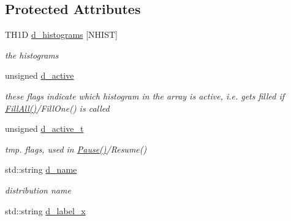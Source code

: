 \subsection*{Protected Attributes}
\begin{DoxyCompactItemize}
\item 
\hypertarget{classHistArray_a53fda50a10b8ba766d44b789313c64c4}{T\-H1\-D \hyperlink{classHistArray_a53fda50a10b8ba766d44b789313c64c4}{d\-\_\-histograms} \mbox{[}N\-H\-I\-S\-T\mbox{]}}\label{classHistArray_a53fda50a10b8ba766d44b789313c64c4}

\begin{DoxyCompactList}\small\item\em the histograms \end{DoxyCompactList}\item 
\hypertarget{classHistArray_ae6faae6b22f5dc62ba9c664a93e8ea82}{unsigned \hyperlink{classHistArray_ae6faae6b22f5dc62ba9c664a93e8ea82}{d\-\_\-active}}\label{classHistArray_ae6faae6b22f5dc62ba9c664a93e8ea82}

\begin{DoxyCompactList}\small\item\em these flags indicate which histogram in the array is active, i.\-e. gets filled if \hyperlink{classHistArray_ae8d7189d1f2b9710a3228deac3eb1fa4}{Fill\-All()}/\-Fill\-One() is called \end{DoxyCompactList}\item 
\hypertarget{classHistArray_ac477be77aa121bf1cbeea842debb2579}{unsigned \hyperlink{classHistArray_ac477be77aa121bf1cbeea842debb2579}{d\-\_\-active\-\_\-t}}\label{classHistArray_ac477be77aa121bf1cbeea842debb2579}

\begin{DoxyCompactList}\small\item\em tmp. flags, used in \hyperlink{classHistArray_a27f9acb7029ec4c90b4476e5bc26037d}{Pause()}/\-Resume() \end{DoxyCompactList}\item 
\hypertarget{classHistArray_a725babbcaabff43acabfbcd8a50eaf76}{std\-::string \hyperlink{classHistArray_a725babbcaabff43acabfbcd8a50eaf76}{d\-\_\-name}}\label{classHistArray_a725babbcaabff43acabfbcd8a50eaf76}

\begin{DoxyCompactList}\small\item\em distribution name \end{DoxyCompactList}\item 
\hypertarget{classHistArray_abda4dd3f06a82c34fff098de0dbcd75a}{std\-::string \hyperlink{classHistArray_abda4dd3f06a82c34fff098de0dbcd75a}{d\-\_\-label\-\_\-x}}\label{classHistArray_abda4dd3f06a82c34fff098de0dbcd75a}


\end{DoxyCompactItemize}
